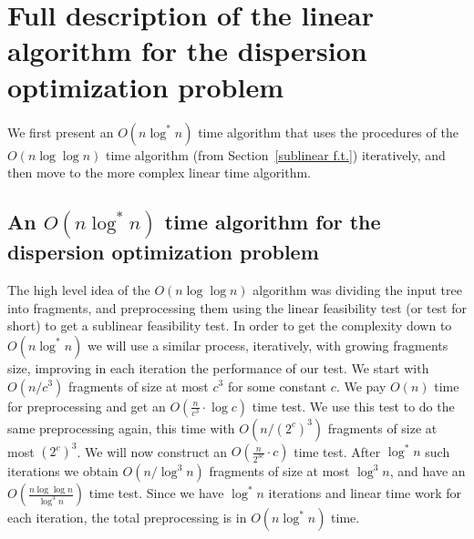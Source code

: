 \documentclass[a4paper,UKenglish]{lipics-v2016}
\theoremstyle{plain}
\begin{document}
\section{Full description of the linear algorithm for the dispersion optimization problem}\label{appendix linear algorithm for the dispersion optimization problem}

We first present an $O(n \log^* n)$ time algorithm that uses the procedures of the $O(n \log \log n)$ time algorithm (from Section~\ref{sublinear f.t.}) iteratively, and then move to the more complex linear time algorithm.

\subsection{An \texorpdfstring{\boldmath$O(n\log^{*}n)$}{O(nlog^*n)} time algorithm for the dispersion optimization problem} \label{sectionlog*}
The high level idea of the $O(n \log \log n)$ algorithm was dividing the input tree into fragments, and preprocessing them using the linear feasibility test (or test for short) to get a sublinear feasibility test. In order to get the complexity down to $O(n \log ^*n)$ we will use a similar process, iteratively, with growing fragments size, improving in each iteration the performance of our test.
We start with $O(n/c^{3})$ fragments of size at most $c^3$ for some constant $c$.
We pay $O(n)$ time for preprocessing and get an $O(\frac{n}{c^3} \cdot \log c)$ time test.
We use this test to do the same preprocessing again, this time with $O(n/(2^{c})^{3})$ fragments of size at most $(2^c)^3$.
We will now construct an $O(\frac{n}{2^{3c}} \cdot c)$ time test.
After $\log ^*n$ such iterations we obtain $O(n/\log^{3}n)$ fragments of size at most $\log ^3n$, and have
an $O(\frac{n \log \log n}{\log ^3n})$ time test. Since we have $\log ^*n$ iterations and linear time work for each
iteration, the total preprocessing is in $O(n \log ^*n)$ time.
\end{document}

